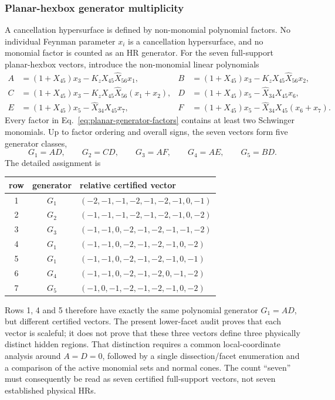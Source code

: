 \documentclass[11pt]{article}
\newcommand{\hX}{\widehat X}
\begin{document}
\subsubsection*{Planar-hexbox generator multiplicity}

A cancellation hypersurface is defined by non-monomial polynomial factors.
No individual Feynman parameter \(x_i\) is a cancellation hypersurface, and
no monomial factor is counted as an HR generator.  For the seven
full-support planar-hexbox vectors, introduce the non-monomial linear
polynomials
\begin{align}
A&=(1+X_{45})x_3-K_zX_{45}\hX_{56}x_1,&
B&=(1+X_{45})x_3-K_zX_{45}\hX_{56}x_2,\nonumber\\
C&=(1+X_{45})x_3-K_zX_{45}\hX_{56}(x_1+x_2),&
D&=(1+X_{45})x_5-\hX_{34}X_{45}x_6,\nonumber\\
E&=(1+X_{45})x_5-\hX_{34}X_{45}x_7,&
F&=(1+X_{45})x_5-\hX_{34}X_{45}(x_6+x_7).
\label{eq:planar-generator-factors}
\end{align}
Every factor in Eq.~\eqref{eq:planar-generator-factors} contains at least two
Schwinger monomials.  Up to factor ordering and overall signs, the seven
vectors form five generator classes,
\begin{equation}
G_1=AD,\qquad G_2=CD,\qquad G_3=AF,\qquad
G_4=AE,\qquad G_5=BD.
\label{eq:planar-generator-classes}
\end{equation}
The detailed assignment is
\begin{center}
\small
\begin{tabular}{@{}ccl@{}}
\toprule
row & generator & relative certified vector\\
\midrule
1 & \(G_1\) & \((-2,-1,-1,-2,-1,-2,-1,0,-1)\)\\
2 & \(G_2\) & \((-1,-1,-1,-2,-1,-2,-1,0,-2)\)\\
3 & \(G_3\) & \((-1,-1,0,-2,-1,-2,-1,-1,-2)\)\\
4 & \(G_1\) & \((-1,-1,0,-2,-1,-2,-1,0,-2)\)\\
5 & \(G_1\) & \((-1,-1,0,-2,-1,-2,-1,0,-1)\)\\
6 & \(G_4\) & \((-1,-1,0,-2,-1,-2,0,-1,-2)\)\\
7 & \(G_5\) & \((-1,0,-1,-2,-1,-2,-1,0,-2)\)\\
\bottomrule
\end{tabular}
\end{center}
Rows 1, 4 and 5 therefore have exactly the same polynomial generator
\(G_1=AD\), but different certified vectors.  The present lower-facet audit
proves that each vector is scaleful; it does not prove that these three
vectors define three physically distinct hidden regions.  That distinction
requires a common local-coordinate analysis around \(A=D=0\), followed by a
single dissection/facet enumeration and a comparison of the active monomial
sets and normal cones.  The count ``seven'' must consequently be read as
seven certified full-support vectors, not seven established physical HRs.
\end{document}
